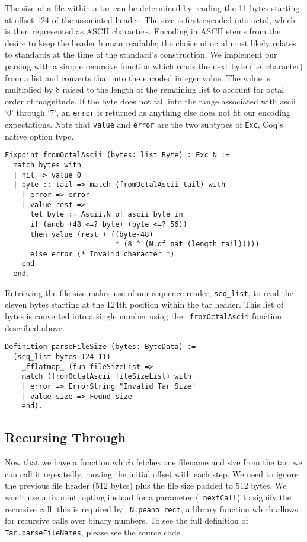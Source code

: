 \documentclass[nocopyrightspace,preprint]{sigplanconf}
\begin{document}
The size of a file within a tar can be determined by reading the 11 bytes
starting at offset 124 of the associated header. The size is first encoded
into octal, which is then represented as ASCII characters. Encoding in ASCII
stems from the desire to keep the header human readable; the choice of octal
most likely relates to standards at the time of the standard's construction.
We implement our parsing with a simple recursive function which reads the next
byte (i.e. character) from a list and converts that into the encoded integer
value. The value is multiplied by 8 raised to the length of the remaining list
to account for octal order of magnitude. If the byte does not fall into the
range associated with ascii `0' through `7', an {\tt error} is returned as
anything else does not fit our encoding expectations. Note that {\tt value}
and {\tt error} are the two subtypes of {\tt Exc}, Coq's native option type.

\begin{lstlisting}
Fixpoint fromOctalAscii (bytes: list Byte) : Exc N :=
  match bytes with
  | nil => value 0
  | byte :: tail => match (fromOctalAscii tail) with
    | error => error
    | value rest => 
      let byte := Ascii.N_of_ascii byte in
      if (andb (48 <=? byte) (byte <=? 56))
      then value (rest + ((byte-48)
                          * (8 ^ (N.of_nat (length tail)))))
      else error (* Invalid character *)
    end
  end.
\end{lstlisting}

Retrieving the file size makes use of our sequence reader, {\tt seq\_list}, to
read the eleven bytes starting at the 124th position within the tar header.
This list of bytes is converted into a single number using the {\tt
fromOctalAscii} function described above.

\begin{lstlisting}
Definition parseFileSize (bytes: ByteData) :=
  (seq_list bytes 124 11)
    _fflatmap_ (fun fileSizeList =>
    match (fromOctalAscii fileSizeList) with
    | error => ErrorString "Invalid Tar Size"
    | value size => Found size
    end).
\end{lstlisting}

\subsection{Recursing Through}

Now that we have a function which fetches one filename and size from the tar,
we can call it repeatedly, moving the initial offset with each step.  We need
to ignore the previous file header (512 bytes) plus the file size padded to
512 bytes. We won't use a fixpoint, opting instead for a parameter ({\tt
nextCall}) to signify the recursive call; this is required by {\tt
N.peano\_rect}, a library function which allows for recursive calls over
binary numbers. To see the full definition of {\tt Tar.parseFileNames}, please
see the source code.
\end{document}
